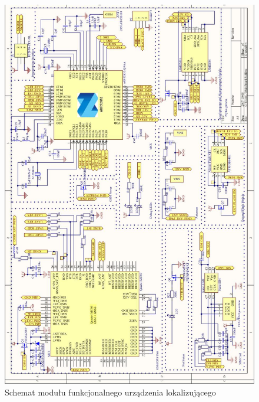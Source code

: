 \begin{figure}[H]
	\centering
	\includegraphics[width=14cm]{img/schematics/mainboard_functional.jpg}
	\caption{Schemat modułu funkcjonalnego urządzenia lokalizującego}
	\label{fig:image_mainboard_functional_schematic}
\end{figure}

